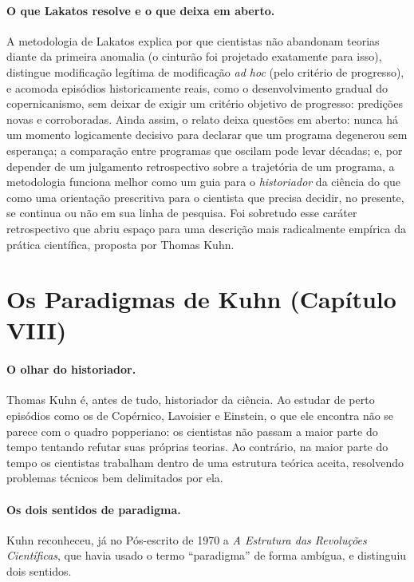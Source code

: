 \documentclass[9pt,a4paper]{extarticle}
\newcommand{\impt}[1]{\textcolor{important}{#1}}
\theoremstyle{definition}
\begin{document}
\paragraph{O que Lakatos resolve e o que deixa em aberto.}
A metodologia de Lakatos explica por que cientistas não abandonam teorias diante da primeira anomalia (o cinturão foi projetado exatamente para isso), distingue modificação legítima de modificação \emph{ad hoc} (pelo critério de progresso), e acomoda episódios historicamente reais, como o desenvolvimento gradual do copernicanismo, sem deixar de exigir um critério \impt{objetivo} de progresso: predições novas e corroboradas. Ainda assim, o relato deixa questões em aberto: nunca há um momento logicamente decisivo para declarar que um programa degenerou sem esperança; a comparação entre programas que oscilam pode levar décadas; e, por depender de um julgamento retrospectivo sobre a trajetória de um programa, a metodologia funciona melhor como um guia para o \emph{historiador} da ciência do que como uma orientação prescritiva para o cientista que precisa decidir, no presente, se continua ou não em sua linha de pesquisa. Foi sobretudo esse caráter retrospectivo que abriu espaço para uma descrição mais radicalmente empírica da prática científica, proposta por Thomas Kuhn.

\section{Os Paradigmas de Kuhn (Capítulo VIII)}

\paragraph{O olhar do historiador.}
Thomas Kuhn é, antes de tudo, historiador da ciência. Ao estudar de perto episódios como os de Copérnico, Lavoisier e Einstein, o que ele encontra não se parece com o quadro popperiano: os cientistas não passam a maior parte do tempo tentando refutar suas próprias teorias. Ao contrário, na maior parte do tempo os cientistas \impt{trabalham dentro} de uma estrutura teórica aceita, resolvendo problemas técnicos bem delimitados por ela.

\paragraph{Os dois sentidos de paradigma.}
Kuhn reconheceu, já no Pós-escrito de 1970 a \emph{A Estrutura das Revoluções Científicas}, que havia usado o termo \enquote{paradigma} de forma ambígua, e distinguiu dois sentidos.
\end{document}
